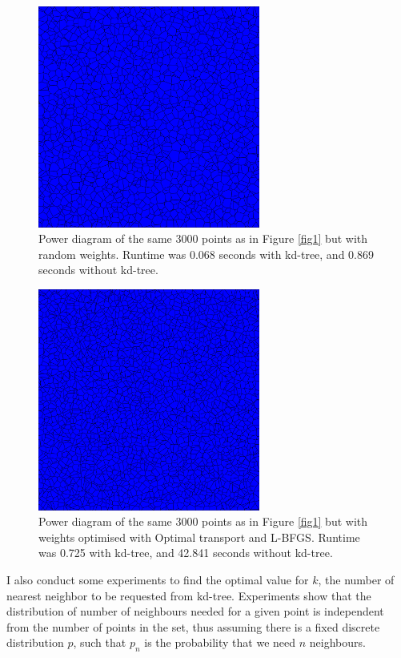 \documentclass{amsart}
\begin{document}
\begin{figure}
    \centering
    \includegraphics[width=0.65\textwidth]{img/voronoi.png}
    \caption{Power diagram of the same 3000 points as in Figure \ref{fig1} but with random weights. Runtime was 0.068 seconds with kd-tree, and 0.869 seconds without kd-tree.}
\end{figure}

\begin{figure}
    \centering
    \includegraphics[width=0.65\textwidth]{img/optimal_transport.png}
    \caption{Power diagram of the same 3000 points as in Figure \ref{fig1} but with weights optimised with Optimal transport and L-BFGS. Runtime was 0.725 with kd-tree, and 42.841 seconds without kd-tree.}
\end{figure}

I also conduct some experiments to find the optimal value for $k$, the number of nearest neighbor to be requested from kd-tree. Experiments show that the distribution of number of neighbours needed for a given point is independent from the number of points in the set, thus assuming there is a fixed discrete distribution $p$, such that $p_n$ is the probability that we need $n$ neighbours.
\end{document}
